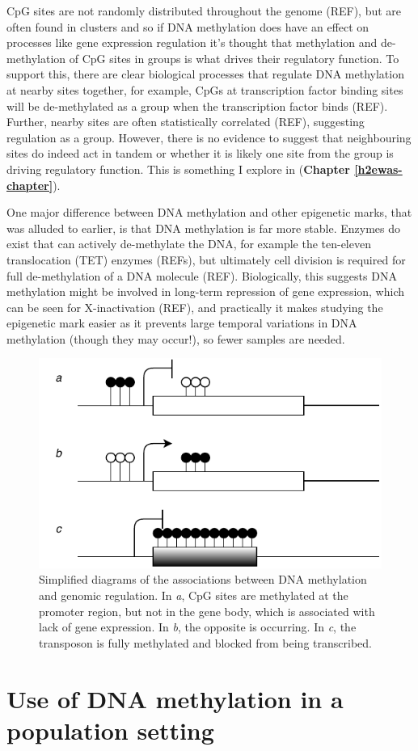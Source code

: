 \documentclass[11pt,twoside]{bristolthesis}
\begin{document}
CpG sites are not randomly distributed throughout the genome (REF), but are often found in clusters and so if DNA methylation does have an effect on processes like gene expression regulation it's thought that methylation and de-methylation of CpG sites in groups is what drives their regulatory function. To support this, there are clear biological processes that regulate DNA methylation at nearby sites together, for example, CpGs at transcription factor binding sites will be de-methylated as a group when the transcription factor binds (REF). Further, nearby sites are often statistically correlated (REF), suggesting regulation as a group. However, there is no evidence to suggest that neighbouring sites do indeed act in tandem or whether it is likely one site from the group is driving regulatory function. This is something I explore in (\textbf{Chapter \ref{h2ewas-chapter}}).

One major difference between DNA methylation and other epigenetic marks, that was alluded to earlier, is that DNA methylation is far more stable. Enzymes do exist that can actively de-methylate the DNA, for example the ten-eleven translocation (TET) enzymes (REFs), but ultimately cell division is required for full de-methylation of a DNA molecule (REF). Biologically, this suggests DNA methylation might be involved in long-term repression of gene expression, which can be seen for X-inactivation (REF), and practically it makes studying the epigenetic mark easier as it prevents large temporal variations in DNA methylation (though they may occur!), so fewer samples are needed.


\begin{figure}
\centering
\includegraphics{figure/01-introduction/dnam-gene-expression.pdf}
\caption{\label{fig:dnam-functions}Simplified diagrams of the associations between DNA methylation and genomic regulation. In \emph{a}, CpG sites are methylated at the promoter region, but not in the gene body, which is associated with lack of gene expression. In \emph{b}, the opposite is occurring. In \emph{c}, the transposon is fully methylated and blocked from being transcribed.}
\end{figure}
\hypertarget{dnam-phs}{%
\section{Use of DNA methylation in a population setting~}\label{dnam-phs}}
\end{document}
